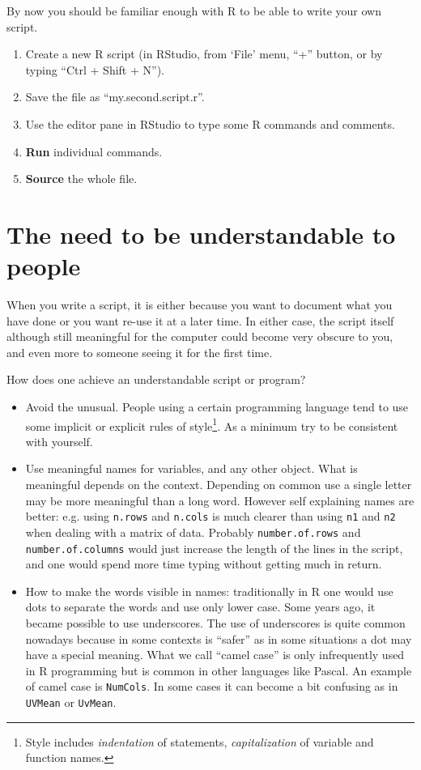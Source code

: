 \documentclass[paper=a4,headsepline,BCOR=12mm,twoside,open=right,%
titlepage,headings=small,fontsize=10pt,index=totoc,bibliography=totoc,%
captions=tableheading,captions=nooneline]{scrbook}\usepackage{knitr}
\begin{document}
By now you should be familiar enough with R to be able to write your own script.
\begin{enumerate}
  \item Create a new R script (in RStudio, from `File' menu, ``+'' button, or by typing ``Ctrl + Shift + N'').
  \item Save the file as ``my.second.script.r''.
  \item Use the editor pane in RStudio to type some R commands and comments.
  \item \textbf{Run} individual commands.
  \item \textbf{Source} the whole file.
\end{enumerate}

\section{The need to be understandable to people}

When you write a script, it is either because you want to document what you have done or you want re-use it at a later time. In either case, the script itself although still meaningful for the computer could become very obscure to you, and even more to someone seeing it for the first time.

How does one achieve an understandable script or program?
\begin{itemize}
  \item Avoid the unusual. People using a certain programming language tend to use some implicit or explicit rules of style\footnote{Style includes \textit{indentation} of statements, \textit{capitalization} of variable and function names.}. As a minimum try to be consistent with yourself.
  \item Use meaningful names for variables, and any other object. What is meaningful depends on the context. Depending on common use a single letter may be more meaningful than a long word. However self explaining names are better: e.g. using \texttt{n.rows} and \texttt{n.cols} is much clearer than using \texttt{n1} and \texttt{n2} when dealing with a matrix of data. Probably \texttt{number.of.rows} and \texttt{number.of.columns} would just increase the length of the lines in the script, and one would spend more time typing without getting much in return.
  \item How to make the words visible in names: traditionally in R one would use dots to separate the words and use only lower case. Some years ago, it became possible to use underscores. The use of underscores is quite common nowadays because in some contexts is ``safer'' as in some situations a dot may have a special meaning. What we call ``camel case'' is only infrequently used in R programming but is common in other languages like Pascal. An example of camel case is \texttt{NumCols}. In some cases it can become a bit confusing as in \texttt{UVMean} or \texttt{UvMean}.
\end{itemize}
\end{document}
